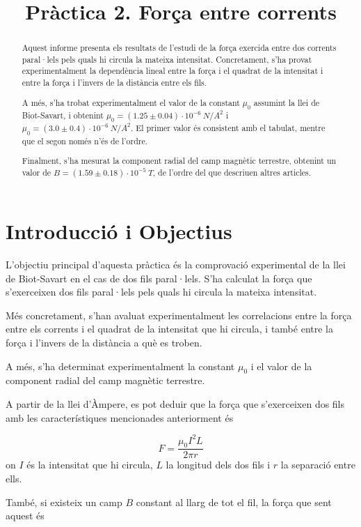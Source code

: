 \documentclass[a4paper,11pt]{article}
\title{Pràctica 2. Força entre corrents}
\date{}
\begin{document}
\maketitle
\begin{abstract}
Aquest informe presenta els resultats de l'estudi de la força exercida entre dos corrents paral·lels pels quals hi circula la mateixa intensitat. Concretament, s'ha provat experimentalment la dependència lineal entre la força i el quadrat de la intensitat i entre la força i l'invers de la distància entre els fils.

A més, s'ha trobat experimentalment el valor de la constant $\mu_0$ assumint la llei de Biot-Savart, i obtenint $\mu_0=(1.25\pm0.04)\cdot10^{-6}\ \si{N/A^2}$ i $\mu_0=(3.0\pm0.4)\cdot10^{-6}\ \si{N/A^2}$. El primer valor és consistent amb el tabulat, mentre que el segon només n'és de l'ordre. 

Finalment, s'ha mesurat la component radial del camp magnètic terrestre, obtenint un valor de $B=(1.59\pm0.18)\cdot10^{-5}\ \si{T}$, de l'ordre del que descriuen altres articles.
\end{abstract}

\section{Introducció i Objectius}
L'objectiu principal d'aquesta pràctica és la comprovació experimental de la llei de Biot-Savart en el cas de dos fils paral·lels. S'ha calculat la força que s'exerceixen dos fils paral·lels pels quals hi circula la mateixa intensitat.

Més concretament, s'han avaluat experimentalment les correlacions entre la força entre els corrents i el quadrat de la intensitat que hi circula, i també entre la força i l'invers de la distància a què es troben.

 A més, s'ha determinat experimentalment la constant $\mu_0$ i el valor de la component radial del camp magnètic terrestre.

A partir de la llei d'Àmpere, es pot deduir que la força que s'exerceixen dos fils amb les característiques mencionades anteriorment és 

\begin{equation}
F=\frac{\mu_0I^2L}{2\pi r}
\end{equation}
on $I$ és la intensitat que hi circula, $L$ la longitud dels dos fils i $r$ la separació entre ells.

També, si existeix un camp $B$ constant al llarg de tot el fil, la força que sent aquest és
\end{document}
